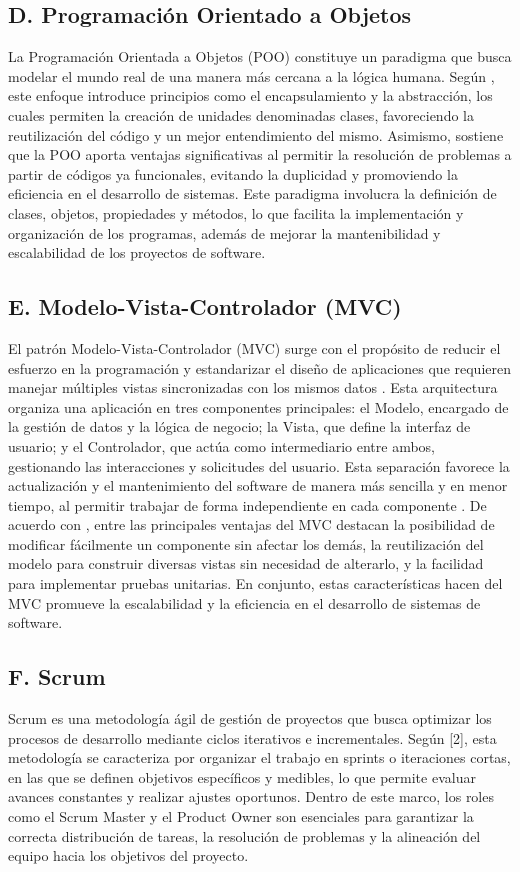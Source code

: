 \subsection{D. Programación Orientado a Objetos}
La Programación Orientada a Objetos (POO) constituye un paradigma que busca modelar el mundo real de una manera más cercana a la lógica humana. Según \cite{vera2022arquitectura}, este enfoque introduce principios como el encapsulamiento y la abstracción, los cuales permiten la creación de unidades denominadas clases, favoreciendo la reutilización del código y un mejor entendimiento del mismo. Asimismo, \cite{vera2022arquitectura} sostiene que la POO aporta ventajas significativas al permitir la resolución de problemas a partir de códigos ya funcionales, evitando la duplicidad y promoviendo la eficiencia en el desarrollo de sistemas. Este paradigma involucra la definición de clases, objetos, propiedades y métodos, lo que facilita la implementación y organización de los programas, además de mejorar la mantenibilidad y escalabilidad de los proyectos de software.

\subsection{E. Modelo-Vista-Controlador (MVC)}
El patrón Modelo-Vista-Controlador (MVC) surge con el propósito de reducir el esfuerzo en la programación y estandarizar el diseño de aplicaciones que requieren manejar múltiples vistas sincronizadas con los mismos datos \cite{zambrano_patron}. Esta arquitectura organiza una aplicación en tres componentes principales: el Modelo, encargado de la gestión de datos y la lógica de negocio; la Vista, que define la interfaz de usuario; y el Controlador, que actúa como intermediario entre ambos, gestionando las interacciones y solicitudes del usuario. Esta separación favorece la actualización y el mantenimiento del software de manera más sencilla y en menor tiempo, al permitir trabajar de forma independiente en cada componente \cite{zambrano_patron}. De acuerdo con \cite{gavilanez2022analisis}, entre las principales ventajas del MVC destacan la posibilidad de modificar fácilmente un componente sin afectar los demás, la reutilización del modelo para construir diversas vistas sin necesidad de alterarlo, y la facilidad para implementar pruebas unitarias. En conjunto, estas características hacen del MVC promueve la escalabilidad y la eficiencia en el desarrollo de sistemas de software.

\subsection{F. Scrum}
Scrum es una metodología ágil de gestión de proyectos que busca optimizar los procesos de desarrollo mediante ciclos iterativos e incrementales. Según [2], esta metodología se caracteriza por organizar el trabajo en sprints o iteraciones cortas, en las que se definen objetivos específicos y medibles, lo que permite evaluar avances constantes y realizar ajustes oportunos. Dentro de este marco, los roles como el Scrum Master y el Product Owner son esenciales para garantizar la correcta distribución de tareas, la resolución de problemas y la alineación del equipo hacia los objetivos del proyecto.